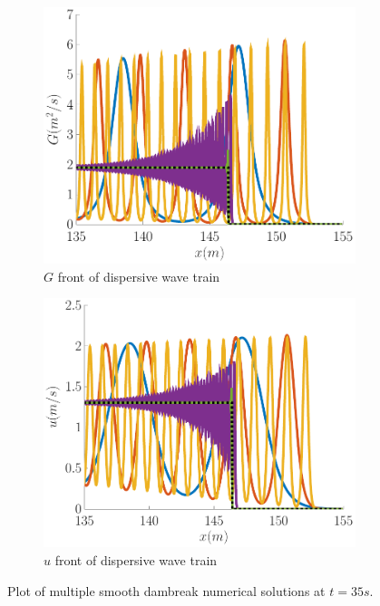 \documentclass[10pt]{article}
\begin{document}
\begin{figure}
\begin{subfigure}{0.32\textwidth}
		\centering
		\includegraphics[width=\textwidth]{./Figures/Simulations/Study/Serre2SWWECloser/GFront.pdf}
		\caption{$G$ front of dispersive wave train}
	\end{subfigure}
	\begin{subfigure}{0.32\textwidth}
		\centering
		\includegraphics[width=\textwidth]{./Figures/Simulations/Study/Serre2SWWECloser/uFront.pdf}
		\caption{$u$ front of dispersive wave train}
	\end{subfigure}
	\caption{Plot of multiple smooth dambreak numerical solutions at $t=35s$.}
\end{figure}
\end{document}
